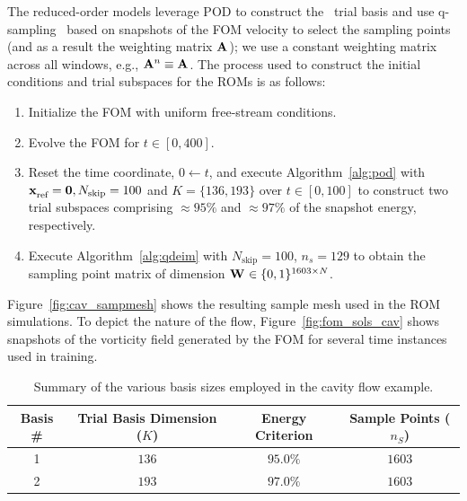 The reduced-order models leverage POD to construct the \spatialAcronym\ trial basis and use q-sampling~\cite{qdeim_drmac} based on snapshots of the FOM velocity to select the sampling points (and as a result the weighting 
matrix $\mathbf{A}^{}$); we use a constant weighting matrix across all windows, e.g., $\mathbf{A}^{n} \equiv \mathbf{A}^{}$. The process used to construct the initial conditions and trial subspaces for the ROMs is as follows:
\begin{enumerate}
\item Initialize the FOM with uniform free-stream conditions.
\item Evolve the FOM for $t \in [0,400]$.
\item Reset the time coordinate, $0 \leftarrow t$, and execute Algorithm~\ref{alg:pod} with $\mathbf{x}_\text{ref}^{} = \boldsymbol 0, N_{\text{skip}} = 100$ and $K = \{136,193\}$ over $t \in [0,100]$ to construct two trial subspaces comprising $\approx 95\%$ and $\approx 97\%$ of the snapshot energy, respectively. 
\item Execute Algorithm~\ref{alg:qdeim} with $N_{\text{skip}} = 100$, $n_s = 129$ to obtain the sampling point matrix of dimension $\mathbf{W}^{} \in \{0,1\}^{1603 \times N }$. 
\end{enumerate}
Figure~\ref{fig:cav_sampmesh} shows the resulting sample mesh used in the ROM simulations. To depict the nature of the flow, Figure~\ref{fig:fom_sols_cav} shows snapshots of the vorticity field generated by the FOM for several time instances used in training.  
\begin{table}[]
\begin{centering}
\begin{tabular}{c c c c}
\hline
Basis \# & Trial Basis Dimension ($K$) &  Energy Criterion & Sample Points ($n_S$) \\
\hline
1    & $136$ & $95.0\%$ & $1603$ \\
2    & $193$ & $97.0\%$ & $1603$ \\
\hline
\end{tabular}
\caption{Summary of the various basis sizes employed in the cavity flow example.}
\label{tab:rom_basis_details}
\end{centering}
\end{table}

